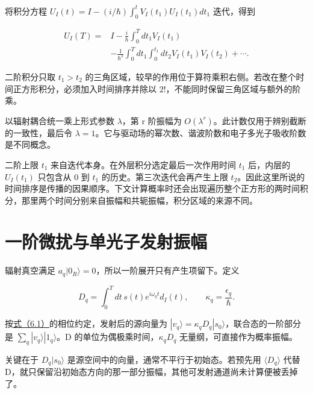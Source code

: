 \documentclass[UTF8,a4paper,zihao=-4,openany,fontset=fandol]{ctexbook}
\begin{document}
将积分方程 $U_I(t)=I-(i/\hbar)\int_0^tV_I(t_1)U_I(t_1)dt_1$ 迭代，得到



\begin{equation*}
\begin{aligned}
U_I(T)={}&I-\frac i\hbar\int_0^Tdt_1V_I(t_1)\\
&-\frac1{\hbar^2}\int_0^Tdt_1\int_0^{t_1}dt_2
V_I(t_1)V_I(t_2)+\cdots .
\end{aligned}
\tag{6.2}\label{eq:6.2}
\end{equation*}


二阶积分只取 $t_1>t_2$ 的三角区域，较早的作用位于算符乘积右侧。若改在整个时间正方形积分，必须加入时间排序并除以 $2!$，不能同时保留三角区域与额外的阶乘。



以辐射耦合统一乘上形式参数 $\lambda$，第 r 阶振幅为 $O(\lambda^r)$。此计数仅用于辨别截断的一致性，最后令 $\lambda=1$。它与驱动场的幂次数、谐波阶数和电子多光子吸收阶数是不同概念。



二阶上限 $t_1$ 来自迭代本身。在外层积分选定最后一次作用时间 $t_1$ 后，内层的 $U_I(t_1)$ 只包含从 0 到 $t_1$ 的历史。第三次迭代会再产生上限 $t_2$。因此这里所说的时间排序是传播的因果顺序。下文计算概率时还会出现遍历整个正方形的两时间积分，那里两个时间分别来自振幅和共轭振幅，积分区域的来源不同。



\section{一阶微扰与单光子发射振幅}\label{sec:06:5}


辐射真空满足 $a_q|0_R\rangle=0$，所以一阶展开只有产生项留下。定义



\begin{equation*}
D_q=\int_0^Tdt\,s(t)e^{i\omega_qt}d_I(t),\qquad
\kappa_q=\frac{\epsilon_q}{\hbar}.
\tag{6.3}\label{eq:6.3}
\end{equation*}


按\hyperref[eq:6.1]{式（6.1）}的相位约定，发射后的源向量为 $|v_q\rangle=\kappa_qD_q|s_0\rangle$，联合态的一阶部分是 $\sum_q|v_q\rangle|1_q\rangle$。D 的单位为偶极乘时间，$\kappa_qD_q$ 无量纲，可直接作为概率振幅。



关键在于 $D_q|s_0\rangle$ 是源空间中的向量，通常不平行于初始态。若预先用 $\langle D_q\rangle$ 代替 D，就只保留沿初始态方向的那一部分振幅，其他可发射通道尚未计算便被丢掉了。
\end{document}
